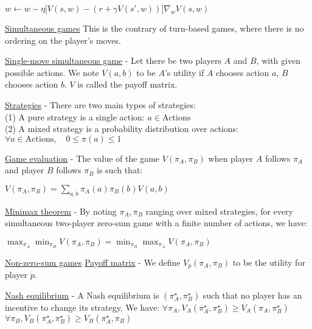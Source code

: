 \documentclass[4pt,landscape]{article}
\begin{document}
\begin{multicols*}{4}
${w\longleftarrow w-\eta\big[V(s,w)-(r+\gamma V(s',w))\big]\nabla_wV(s,w)}$


\underline{Simultaneous games}
{This is the contrary of turn-based games, where there is no ordering on the player's moves.}\par

{\underline{Single-move simultaneous game} - Let there be two players $A$ and $B$, with given possible actions. We note $V(a,b)$ to be $A$'s utility if $A$ chooses action $a$, $B$ chooses action $b$. $V$ is called the payoff matrix.}\par

{\underline{Strategies} - There are two main types of strategies:\\
(1) A pure strategy is a single action: ${a\in\textrm{Actions}}$\\

(2) A mixed strategy is a probability distribution over actions: $\forall a\in\textrm{Actions},\quad{0\leqslant\pi(a)\leqslant1}$}\par

{\underline{Game evaluation} - The value of the game $V(\pi_A,\pi_B)$ when player $A$ follows $\pi_A$ and player $B$ follows $\pi_B$ is such that:}\par

${V(\pi_A,\pi_B)=\sum_{a,b}\pi_A(a)\pi_B(b)V(a,b)}$


{\underline{Minimax theorem} - By noting $\pi_A,\pi_B$ ranging over mixed strategies, for every simultaneous two-player zero-sum game with a finite number of actions, we have:}\par

${\max_{\pi_A}\min_{\pi_B}V(\pi_A,\pi_B)=\min_{\pi_B}\max_{\pi_A}V(\pi_A,\pi_B)}$


\underline{Non-zero-sum games}
{\underline{Payoff matrix} - We define $V_p(\pi_A,\pi_B)$ to be the utility for player $p$.}\par

{\tiny \underline{Nash equilibrium} - A Nash equilibrium is $(\pi_A^\star,\pi_B^\star)$ such that no player has an incentive to change its strategy. We have: ${\forall \pi_A, V_A(\pi_A^\star,\pi_B^\star)\geqslant V_A(\pi_A,\pi_B^\star)}$\\${\forall \pi_B, V_B(\pi_A^\star,\pi_B^\star)\geqslant V_B(\pi_A^\star,\pi_B)}$}



{\color{magenta} \hrulefill}\\


\end{multicols*}
\end{document}
